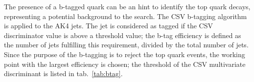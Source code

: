% 

The presence of a b-tagged quark can be an hint to identify the top quark decays, representing a potential background to the search. The CSV b-tagging algorithm~\cite{Chatrchyan:2012jua} is applied to the AK4 jets. The jet is considered as tagged if the CSV discriminator value is above a threshold value; the b-tag efficiency is defined as the number of jets fulfilling this requirement, divided by the total number of jets. Since the purpose of the b-tagging is to reject the top quark events, the working point with the largest efficiency is chosen; the threshold of the CSV multivariate discriminant is listed in tab.~\ref{tab:btag}. 

